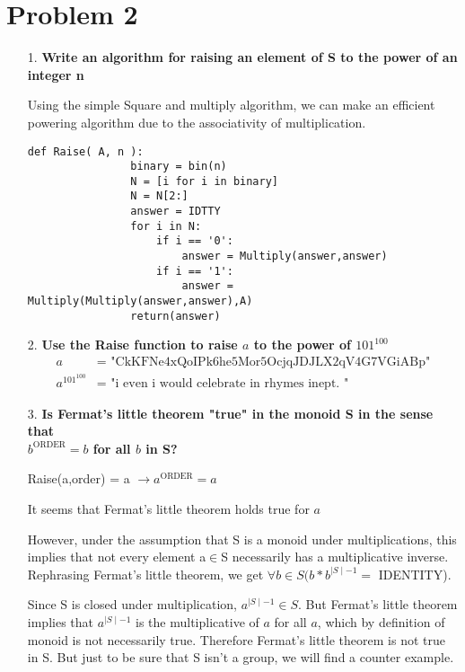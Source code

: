 \documentclass[12pt,letterpaper]{article}
\begin{document}
\section*{Problem 2}

\begin{itemize}
    \item [1.] \textbf{Write an algorithm for raising an element of S to the power of an integer n}
        
        Using the simple Square and multiply algorithm, we can make an efficient powering algorithm due to the associativity of multiplication. \cite{Crypto}
            \begin{lstlisting}[style = Python]
                def Raise( A, n ):
                binary = bin(n)
                N = [i for i in binary]
                N = N[2:]
                answer = IDTTY
                for i in N:
                    if i == '0':
                        answer = Multiply(answer,answer)
                    if i == '1':
                        answer = Multiply(Multiply(answer,answer),A)
                return(answer)
        \end{lstlisting}
    \item [2.] \textbf{Use the Raise function to raise $a$ to the power of $101^{100}$}
        \begin{align*}
            a &=\text{ "CkKFNe4xQoIPk6he5Mor5OcjqJDJLX2qV4G7VGiABp"}\\
            a^{101^{100}} &= \text{ "i even i would celebrate in rhymes inept. "}  
        \end{align*}
        
    \item [3.] \textbf{Is Fermat's little theorem "true" in the monoid S in the sense that\\ $b^{\text{ORDER}} = b$ for all $b$ in S?}
        
        Raise(a,order) = a $\rightarrow a^\text{ORDER} = a$
        
        It seems that Fermat's little theorem holds true for $a$
        
        However, under the assumption that S is a monoid under multiplications, this implies that not every element a$\in$S necessarily has a multiplicative inverse.
        Rephrasing Fermat's little theorem, we get $\forall b\in S(b*b^{\mid S\mid -1} =$ IDENTITY).
        
        Since S is closed under multiplication, $a^{\mid S\mid -1}\in S$. But Fermat's little theorem implies that $a^{\mid S\mid -1}$ is the multiplicative of $a$ for all $a$, which by definition of monoid is not necessarily true. Therefore Fermat's little theorem is not true in S. But just to be sure that S isn't a group, we will find a counter example.
        

\end{itemize}
\end{document}

